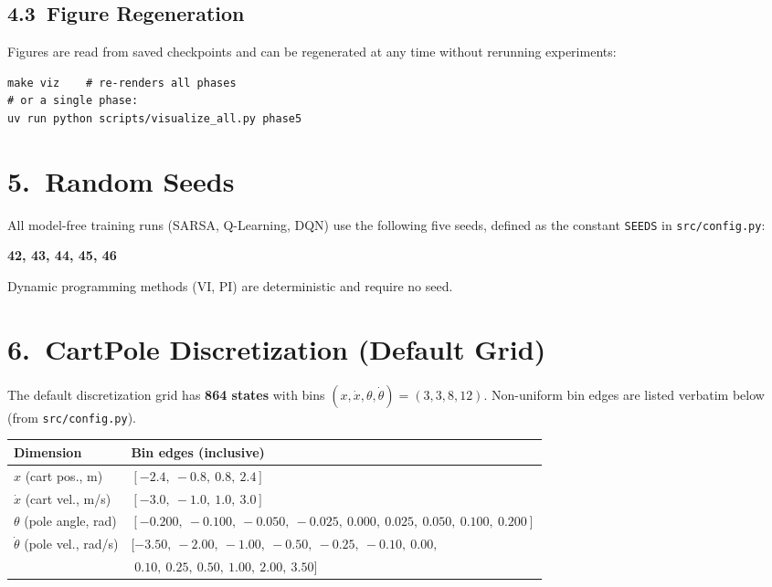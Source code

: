 \documentclass[letterpaper, 11pt]{article}
\begin{document}
\subsection*{4.3\ Figure Regeneration}

Figures are read from saved checkpoints and can be regenerated at any time
without rerunning experiments:

\begin{lstlisting}
make viz    # re-renders all phases
# or a single phase:
uv run python scripts/visualize_all.py phase5
\end{lstlisting}

\section*{5.\ Random Seeds}

All model-free training runs (SARSA, Q-Learning, DQN) use the following five
seeds, defined as the constant \texttt{SEEDS} in \texttt{src/config.py}:

\begin{center}
\textbf{42, 43, 44, 45, 46}
\end{center}

Dynamic programming methods (VI, PI) are deterministic and require no seed.

\section*{6.\ CartPole Discretization (Default Grid)}

The default discretization grid has \textbf{864 states} with bins
$(x, \dot{x}, \theta, \dot{\theta}) = (3, 3, 8, 12)$.
Non-uniform bin edges are listed verbatim below (from \texttt{src/config.py}).

\begin{center}
\renewcommand{\arraystretch}{1.15}
\begin{tabular}{lp{10cm}}
\toprule
\textbf{Dimension} & \textbf{Bin edges (inclusive)} \\
\midrule
$x$ (cart pos., m)
  & $[-2.4,\ -0.8,\ 0.8,\ 2.4]$ \\
$\dot{x}$ (cart vel., m/s)
  & $[-3.0,\ -1.0,\ 1.0,\ 3.0]$ \\
$\theta$ (pole angle, rad)
  & $[-0.200,\ -0.100,\ -0.050,\ -0.025,\ 0.000,\ 0.025,\ 0.050,\ 0.100,\ 0.200]$ \\
$\dot{\theta}$ (pole vel., rad/s)
  & $[-3.50,\ -2.00,\ -1.00,\ -0.50,\ -0.25,\ -0.10,\ 0.00,$\\
  & $\phantom{[}0.10,\ 0.25,\ 0.50,\ 1.00,\ 2.00,\ 3.50]$ \\
\bottomrule
\end{tabular}
\end{center}
\end{document}
